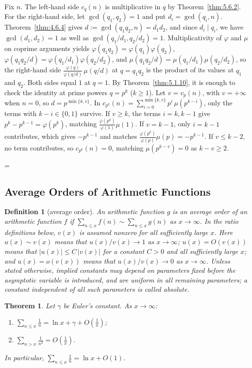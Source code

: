 \documentclass[11pt]{article}
\makeatletter
\theoremstyle{ntstyle}
\newtheorem{theorem}{Theorem}[subsection]
\newtheorem{definition}{Definition}[subsection]
\let\nt@closedisplay\]
\def\nt@guardedclose{\@ifnextchar\par{\nt@closeafterpar}{\@ifnextchar\end{\postdisplaypenalty\@M\nt@closedisplay}{\nt@closedisplay}}}
\def\nt@closeafterpar\par{\@ifnextchar\par{\nt@closeafterpar}{\@ifnextchar\end{\postdisplaypenalty\@M\nt@closedisplay\par}{\nt@closedisplay\par}}}
\renewenvironment{proof}[1][\proofname]{\par
  \pushQED{\qed}\normalfont\topsep\medskipamount\edef\nt@afterproof{\@endparpenalty=\the\@endparpenalty\relax}\@beginparpenalty\@M\@endparpenalty\@M\let\]\nt@guardedclose\trivlist\item[]\textit{#1\@addpunct{.}} \ignorespaces}{\ifvmode\addpenalty\@M\fi\popQED\nt@afterproof\endtrivlist\@endpefalse}
\makeatother
\begin{document}
\begin{proof} Fix $n$. The left-hand side $c_q(n)$ is multiplicative in $q$ by Theorem~\ref{thm:5.6.2}. For the right-hand side, let $\gcd(q_1, q_2) = 1$ and put $d_i = \gcd(q_i, n)$. Theorem~\ref{thm:4.6.4} gives $d := \gcd(q_1 q_2, n) = d_1 d_2$, and since $d_i \mid q_i$, we have $\gcd(d_1, d_2) = 1$ as well as $\gcd(q_1/d_1, q_2/d_2) = 1$. Multiplicativity of $\varphi$ and $\mu$ on coprime arguments yields $\varphi(q_1 q_2) = \varphi(q_1)\varphi(q_2)$, $\varphi(q_1 q_2/d) = \varphi(q_1/d_1)\varphi(q_2/d_2)$, and $\mu(q_1 q_2/d) = \mu(q_1/d_1)\mu(q_2/d_2)$, so the right-hand side $\tfrac{\varphi(q)}{\varphi(q/d)}\,\mu(q/d)$ at $q = q_1 q_2$ is the product of its values at $q_1$ and $q_2$. Both sides equal
	$1$ at $q = 1$. By Theorem~\ref{thm:5.1.10}, it is enough to
	check the identity at prime powers $q = p^{k}$ ($k \ge 1$). Let $v=v_p(n)$, with $v=+\infty$ when $n=0$, so
	$d=p^{\min\{k,v\}}$. In $c_{p^{k}}(n) = \sum_{i=0}^{\min\{k, v\}}
	p^{i}\, \mu(p^{k-i})$, only the terms with $k - i \in \{0,1\}$ survive. If $v \ge k$,
	the terms $i = k, k-1$ give $p^{k} - p^{k-1} = \varphi(p^{k})$,
	matching $\tfrac{\varphi(p^{k})}{\varphi(1)}\mu(1)$. If $v = k-1$,
	only $i = k-1$ contributes, which gives $-p^{k-1}$ and matches
	$\tfrac{\varphi(p^{k})}{\varphi(p)}\mu(p) = -p^{k-1}$. If $v \le k-2$,
	no term contributes, so $c_{p^{k}}(n) = 0$, matching $\mu(p^{k-v}) = 0$
	as $k - v \ge 2$.

\end{proof}
\subsection{Average Orders of Arithmetic Functions}

\begin{definition}[average order]\label{def:5.7.1} An arithmetic
	function $g$ is an average order of an arithmetic function $f$ if
	$\sum_{n\le x}f(n)\sim\sum_{n\le x}g(n)$ as $x\to\infty$. In the ratio definitions below, $v(x)$ is assumed nonzero for all sufficiently large $x$. Here $u(x)\sim v(x)$ means that $u(x)/v(x)\to1$ as $x\to\infty$; $u(x)=O(v(x))$ means that $|u(x)|\le C\,|v(x)|$ for a constant $C>0$ and all sufficiently large $x$; and $u(x)=o(v(x))$ means that $u(x)/v(x)\to0$ as $x\to\infty$. Unless stated otherwise, implied constants may depend on parameters fixed before the asymptotic variable is introduced, and are uniform in all remaining parameters; a constant independent of all such parameters is called absolute.

\end{definition}
\begin{theorem}\label{thm:5.7.1} Let $\gamma$ be Euler's constant. As
	$x\to\infty$:
	\begin{enumerate}[label={\alph*)}]
		\item $\displaystyle \sum_{n\le x}\frac{1}{n}=\ln x+\gamma+O\!\left(\frac{1}{x}\right)$;
		\item $\displaystyle \sum_{n>x}\frac{1}{n^{2}}=O\!\left(\frac{1}{x}\right)$.
	\end{enumerate}
	In particular, $\sum_{n\le x}\tfrac{1}{n}=\ln x+O(1)$.

\end{theorem}
\end{document}
